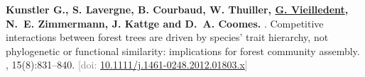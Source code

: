 \documentclass[10pt,a4paper,sans]{moderncv}
\newcounter{enumiv_gv}
\begin{document}
\begin{thebibliography}{5}
\setcounter{enumiv}{0}
\textbf{Kunstler G., S. Lavergne, B. Courbaud, W. Thuiller,
  \underline{G. Vieilledent}, N.~E. Zimmermann, J. Kattge and D.~A. Coomes.}
.
\newblock Competitive interactions between forest trees are driven by species'
  trait hierarchy, not phylogenetic or functional similarity: implications for
  forest community assembly.
, 15(8):831--840.
\newblock \textcolor{gray}{[doi: \href{http://dx.doi.org/10.1111/j.1461-0248.2012.01803.x}{10.1111/j.1461-0248.2012.01803.x}]}

\end{thebibliography}
\end{document}
